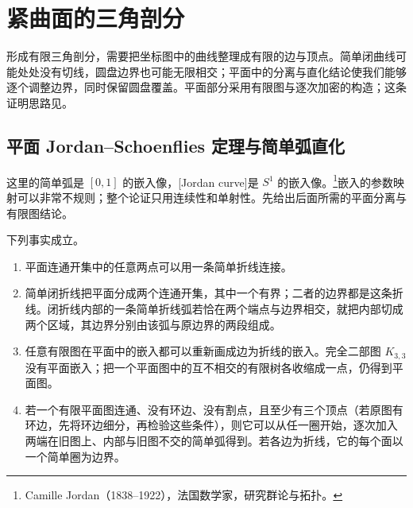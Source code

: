 
% 
% 
% 
% 

\section{紧曲面的三角剖分}
\label{g1:sec:0602}

形成有限三角剖分，需要把坐标图中的曲线整理成有限的边与顶点。简单闭曲线可能处处没有切线，圆盘边界也可能无限相交；平面中的分离与直化结论使我们能够逐个调整边界，同时保留圆盘覆盖。平面部分采用有限图与逐次加密的构造；这条证明思路见\cite[第2--4节]{Thomassen1992}。

\subsection{平面 Jordan–Schoenflies 定理与简单弧直化}
\label{g1:subsec:0602:01}

这里的简单弧是 \([0,1]\) 的嵌入像，[Jordan curve]是 \(S^1\) 的嵌入像。\footnote{Camille Jordan（1838--1922），法国数学家，研究群论与拓扑。}嵌入的参数映射可以非常不规则；整个论证只用连续性和单射性。先给出后面所需的平面分离与有限图结论。

\begin{lemma}\label{g1:lem:polygonal-plane-tools}
	下列事实成立。
	\begin{enumerate}
		\item 平面连通开集中的任意两点可以用一条简单折线连接。
		\item 简单闭折线把平面分成两个连通开集，其中一个有界；二者的边界都是这条折线。闭折线内部的一条简单折线弧若恰在两个端点与边界相交，就把内部切成两个区域，其边界分别由该弧与原边界的两段组成。
		\item 任意有限图在平面中的嵌入都可以重新画成边为折线的嵌入。完全二部图 \(K_{3,3}\) 没有平面嵌入；把一个平面图中的互不相交的有限树各收缩成一点，仍得到平面图。
		\item 若一个有限平面图连通、没有环边、没有割点，且至少有三个顶点（若原图有环边，先将环边细分，再检验这些条件），则它可以从任一圈开始，逐次加入两端在旧图上、内部与旧图不交的简单弧得到。若各边为折线，它的每个面以一个简单圈为边界。
	\end{enumerate}
\end{lemma}

